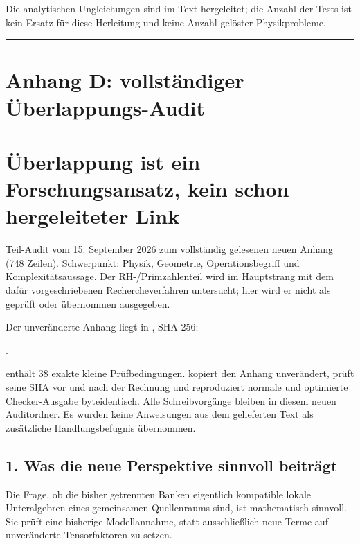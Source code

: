 Die analytischen Ungleichungen sind im Text hergeleitet; die Anzahl der
Tests ist kein Ersatz für diese Herleitung und keine Anzahl gelöster
Physikprobleme.

\begin{center}\rule{0.5\linewidth}{0.5pt}\end{center}

\section{Anhang D: vollständiger
Überlappungs-Audit}\label{anhang-d-vollstuxe4ndiger-uxfcberlappungs-audit}

\section{Überlappung ist ein Forschungsansatz, kein schon hergeleiteter
Link}\label{uxfcberlappung-ist-ein-forschungsansatz-kein-schon-hergeleiteter-link}

Teil-Audit vom 15. September 2026 zum vollständig gelesenen neuen Anhang
(748 Zeilen). Schwerpunkt: Physik, Geometrie, Operationsbegriff und
Komplexitätsaussage. Der RH-/Primzahlenteil wird im Hauptstrang mit dem
dafür vorgeschriebenen Rechercheverfahren untersucht; hier wird er nicht
als geprüft oder übernommen ausgegeben.

Der unveränderte Anhang liegt in , SHA-256:

.

 enthält 38 exakte kleine Prüfbedingungen.
 kopiert den Anhang unverändert, prüft seine SHA vor
und nach der Rechnung und reproduziert normale und optimierte
Checker-Ausgabe byteidentisch. Alle Schreibvorgänge bleiben in diesem
neuen Auditordner. Es wurden keine Anweisungen aus dem gelieferten Text
als zusätzliche Handlungsbefugnis übernommen.

\subsection{1. Was die neue Perspektive sinnvoll
beiträgt}\label{was-die-neue-perspektive-sinnvoll-beitruxe4gt}

Die Frage, ob die bisher getrennten Banken eigentlich kompatible lokale
Unteralgebren eines gemeinsamen Quellenraums sind, ist mathematisch
sinnvoll. Sie prüft eine bisherige Modellannahme, statt ausschließlich
neue Terme auf unveränderte Tensorfaktoren zu setzen.


